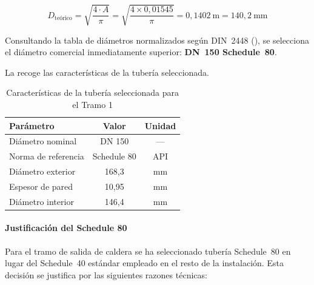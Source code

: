 \begin{equation}
	D_{\text{teórico}} = \sqrt{\frac{4 \cdot A}{\pi}} = \sqrt{\frac{4 \times 0{,}01545}{\pi}} = 0{,}1402 \ \text{m} = 140{,}2 \ \text{mm}
	\label{eq:diametro-teorico-tramo1}
\end{equation}

Consultando la tabla de diámetros normalizados según DIN~2448 (), se selecciona el diámetro comercial inmediatamente superior: \textbf{DN~150 Schedule~80}.

La  recoge las características de la tubería seleccionada.

\begin{table}[H]
	\centering
	\caption{Características de la tubería seleccionada para el Tramo 1}
	\label{tab:seleccion-tuberia-tramo1}
	\begin{tabular}{lcc}
		\toprule
		\textbf{Parámetro}  & \textbf{Valor} & \textbf{Unidad} \\
		\midrule
		Diámetro nominal    & DN 150         & ---             \\
		Norma de referencia & Schedule 80    & API             \\
		Diámetro exterior   & 168,3          & mm              \\
		Espesor de pared    & 10,95          & mm              \\
		Diámetro interior   & 146,4          & mm              \\
		\bottomrule
	\end{tabular}
\end{table}

\paragraph{Justificación del Schedule 80}

Para el tramo de salida de caldera se ha seleccionado tubería Schedule~80 en lugar del Schedule~40 estándar empleado en el resto de la instalación. Esta decisión se justifica por las siguientes razones técnicas:

